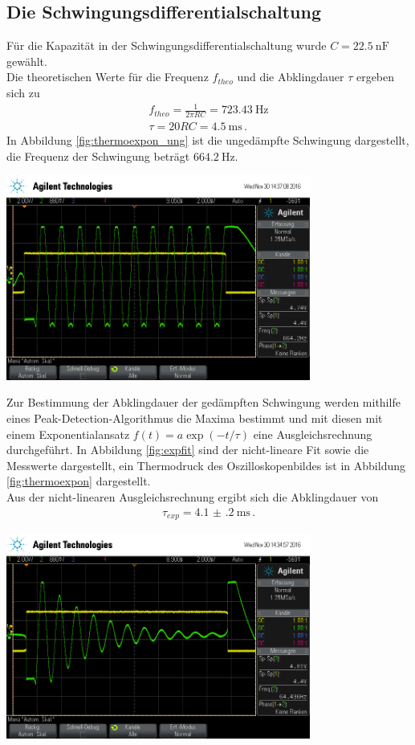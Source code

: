 \documentclass[]{scrartcl}
\begin{document}
\subsection{Die Schwingungsdifferentialschaltung}
Für die Kapazität in der Schwingungsdifferentialschaltung wurde $C=\SI{22.5}{\nano\farad}$ gewählt. \\
Die theoretischen Werte für die Frequenz $f_{theo}$ und die Abklingdauer $\tau$ ergeben sich zu
\begin{align}
f_{theo} = \frac{1}{2\pi RC}=\SI{723.43}{\hertz} \\
\tau = 20RC=\SI{4.5}{\milli\second}\,.
\end{align}
In Abbildung \ref{fig:thermoexpon_ung} ist die ungedämpfte Schwingung dargestellt, die Frequenz der Schwingung beträgt $\SI{664.2}{\hertz}$.
\begin{center}
	\includegraphics[width=10cm]{images/schwingung.png}
	\label{fig:thermoexpon_ung}
\end{center}
Zur Bestimmung der Abklingdauer der gedämpften Schwingung werden mithilfe eines Peak-Detection-Algorithmus die Maxima bestimmt und mit diesen mit einem Exponentialansatz $f(t)=a\exp\left(-t/\tau\right) $ eine Ausgleichsrechnung durchgeführt. In Abbildung \ref{fig:expfit} sind der nicht-lineare Fit sowie die Messwerte dargestellt, ein Thermodruck des Oszilloskopenbildes ist in Abbildung \ref{fig:thermoexpon} dargestellt. \\
Aus der nicht-linearen Ausgleichsrechnung ergibt sich die Abklingdauer von
\begin{align*}
\tau_{exp}=\SI{4.1(2)}{\milli\second}\,.
\end{align*}
\begin{center}
	\includegraphics[width=10cm]{images/schwinggen.png}
	\label{fig:thermoexpon}
\end{center}
\end{document}

